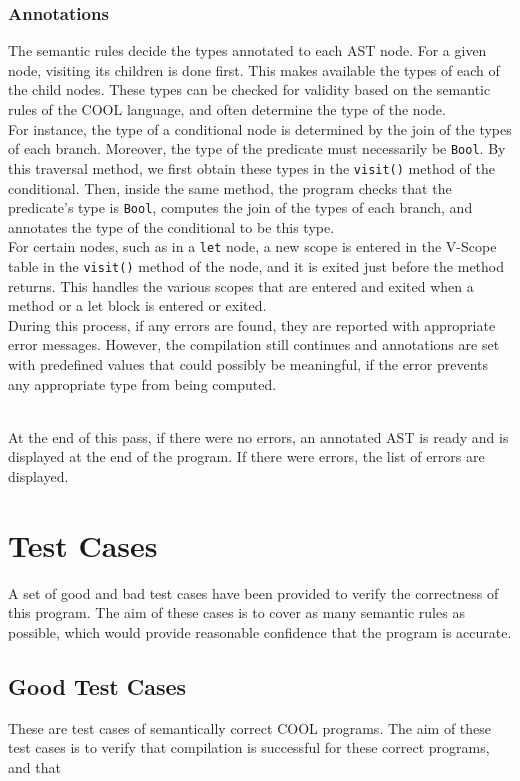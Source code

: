 \documentclass{article}
\begin{document}
\subsubsection*{Annotations}
The semantic rules decide the types annotated to each AST node. For a given node, visiting its children is done first. This makes available the types of each of the child nodes. These types can be checked for validity based on the semantic rules of the COOL language, and often determine the type of the node.
\\
For instance, the type of a conditional node is determined by the join of the types of each branch. Moreover, the type of the predicate must necessarily be \verb|Bool|. By this traversal method, we first obtain these types in the \verb|visit()| method of the conditional. Then, inside the same method, the program checks that the predicate's type is \verb|Bool|, computes the join of the types of each branch, and annotates the type of the conditional to be this type.
\\
For certain nodes, such as in a \verb|let| node, a new scope is entered in the V-Scope table in the \verb|visit()| method of the node, and it is exited just before the method returns. This handles the various scopes that are entered and exited when a method or a let block is entered or exited.
\\
During this process, if any errors are found, they are reported with appropriate error messages. However, the compilation still continues and annotations are set with predefined values that could possibly be meaningful, if the error prevents any appropriate type from being computed.

~\\
At the end of this pass, if there were no errors, an annotated AST is ready and is displayed at the end of the program. If there were errors, the list of errors are displayed.

\section{Test Cases}
A set of good and bad test cases have been provided to verify the correctness of this program. The aim of these cases is to cover as many semantic rules as possible, which would provide reasonable confidence that the program is accurate.

\subsection*{Good Test Cases}
These are test cases of semantically correct COOL programs. The aim of these test cases is to verify that compilation is successful for these correct programs, and that 
\end{document}
